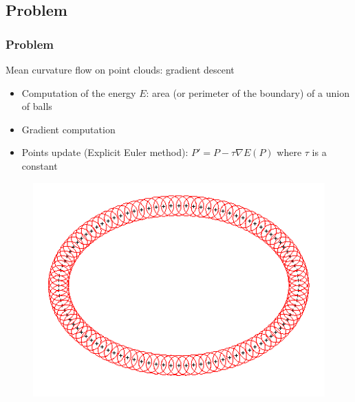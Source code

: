 \documentclass{beamer}
\begin{document}
\subsection{Problem}
\begin{frame}
    \frametitle{Problem}

    Mean curvature flow on point clouds: gradient descent
    \begin{itemize}
        \item Computation of the energy $ E $: area (or perimeter of the boundary) of a union of balls
        \item Gradient computation
        \item Points update (Explicit Euler method): $ P' = P - \tau
            \nabla E (P) $ where $ \tau $ is a constant
    \end{itemize}

    \begin{figure}
        \centering
        \includegraphics[scale=0.28]{img/ellipse-balls-15}
    \end{figure}
\end{frame}
\end{document}
